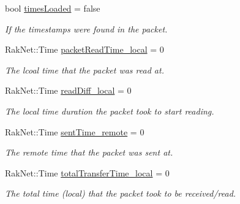 \begin{DoxyCompactItemize}
\item 
\hypertarget{struct_champ_net_1_1_time_stamp_a15ed2cd3a07ef3b0b4bd58a0cbc2060c}{bool \hyperlink{struct_champ_net_1_1_time_stamp_a15ed2cd3a07ef3b0b4bd58a0cbc2060c}{times\-Loaded} = false}\label{struct_champ_net_1_1_time_stamp_a15ed2cd3a07ef3b0b4bd58a0cbc2060c}

\begin{DoxyCompactList}\small\item\em If the timestamps were found in the packet. \end{DoxyCompactList}\item 
\hypertarget{struct_champ_net_1_1_time_stamp_ad2369d7af00c796be178f28ed2d14438}{Rak\-Net\-::\-Time \hyperlink{struct_champ_net_1_1_time_stamp_ad2369d7af00c796be178f28ed2d14438}{packet\-Read\-Time\-\_\-local} = 0}\label{struct_champ_net_1_1_time_stamp_ad2369d7af00c796be178f28ed2d14438}

\begin{DoxyCompactList}\small\item\em The lcoal time that the packet was read at. \end{DoxyCompactList}\item 
\hypertarget{struct_champ_net_1_1_time_stamp_aa2e6c532773210386df4ff9d2c5e1f2b}{Rak\-Net\-::\-Time \hyperlink{struct_champ_net_1_1_time_stamp_aa2e6c532773210386df4ff9d2c5e1f2b}{read\-Diff\-\_\-local} = 0}\label{struct_champ_net_1_1_time_stamp_aa2e6c532773210386df4ff9d2c5e1f2b}

\begin{DoxyCompactList}\small\item\em The local time duration the packet took to start reading. \end{DoxyCompactList}\item 
\hypertarget{struct_champ_net_1_1_time_stamp_aa99efe10e72f2c086f81e77cc6fbd337}{Rak\-Net\-::\-Time \hyperlink{struct_champ_net_1_1_time_stamp_aa99efe10e72f2c086f81e77cc6fbd337}{sent\-Time\-\_\-remote} = 0}\label{struct_champ_net_1_1_time_stamp_aa99efe10e72f2c086f81e77cc6fbd337}

\begin{DoxyCompactList}\small\item\em The remote time that the packet was sent at. \end{DoxyCompactList}\item 
\hypertarget{struct_champ_net_1_1_time_stamp_ae8466c79c649081a4027fd7ed355e9c1}{Rak\-Net\-::\-Time \hyperlink{struct_champ_net_1_1_time_stamp_ae8466c79c649081a4027fd7ed355e9c1}{total\-Transfer\-Time\-\_\-local} = 0}\label{struct_champ_net_1_1_time_stamp_ae8466c79c649081a4027fd7ed355e9c1}

\begin{DoxyCompactList}\small\item\em The total time (local) that the packet took to be received/read. \end{DoxyCompactList}\end{DoxyCompactItemize}


